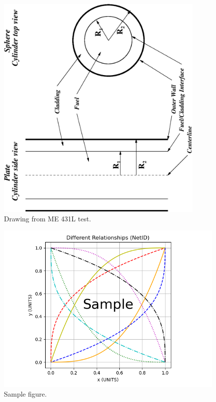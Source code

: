 \documentclass{article}
\begin{document}
\begin{figure}[htb]
\begin{center}
\includegraphics[angle=-90, width=4in]{drawing.eps}
\caption{Drawing from ME 431L test.}
\end{center}
\end{figure}

\begin{figure}[!h]
\begin{center}
\includegraphics[width=5in]{SamplePyplot.png}
\caption{Sample figure.}
\end{center}
\end{figure}
\pagebreak
\end{document}
